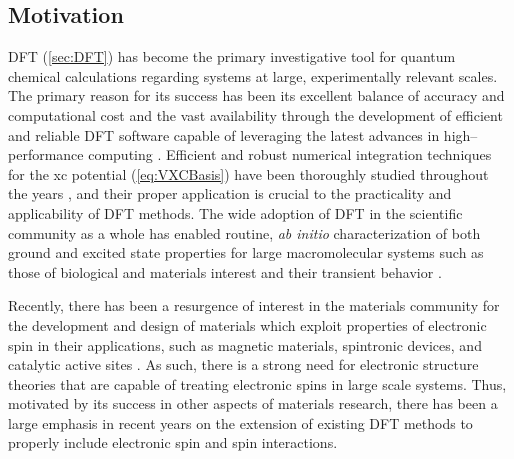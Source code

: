 \subsection{Motivation}
\label{sec:NCDFT_Motiv}

DFT (\cref{sec:DFT}) has become the primary investigative tool for quantum chemical calculations
regarding systems at large, experimentally relevant scales. The primary reason
for its success has been its excellent balance of accuracy and computational
cost and the vast availability through the development of efficient and
reliable DFT software capable of leveraging the latest advances in
high--performance computing \cite{Genovese17_e1290}.  
Efficient and robust numerical integration techniques for the xc potential (\cref{eq:VXCBasis}) have been
thoroughly studied throughout the
years \cite{Becke88_2547,Jackson90_7453,Laming93_997,Johnson95_169,Frisch96_213,Reveles04_681,Sierka11_3097},
and their proper application is crucial to the practicality and applicability
of DFT methods.  The wide adoption of DFT in the scientific community as
a whole has enabled routine, \emph{ab initio} characterization of both ground
and excited state properties for large macromolecular systems such as those of
biological \cite{Payne14_3614,Mennucci17_294,Rega18_1126} and
materials \cite{Ceder06_659,Skylaris16_220901,Li16_165402,Li16_7255,Li16_1601307,Li17_161}
interest and their transient
behavior \cite{Li16_104107,Li16_935,Li16_4501,Li17_3958}.

Recently, there has been a resurgence of interest in the materials community
for the development and design of materials which exploit properties of
electronic spin in their applications, such as magnetic materials, spintronic
devices, and catalytic active sites
\cite{Berdinsky02_603,Ullrich06_2285,Sanvito11_3336,Mouritsen16_299} .  As
such, there is a strong need for electronic structure theories that are capable
of treating electronic spins in large scale systems. Thus, motivated by its
success in other aspects of materials research, there has been a large emphasis
in recent years on the extension of existing DFT methods to properly
include electronic spin and spin interactions.

